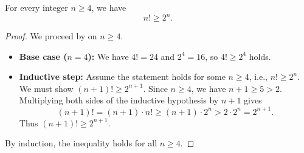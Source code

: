 \begin{lemma} \label{lemma:factorial_lower_bound_by_power_of_two_for_n_ge_4}
    For every integer $n \geq 4$, we have
    $$n! \geq 2^n.$$
\end{lemma}
\begin{proof}
    We proceed by  on $n \geq 4$.
    \begin{itemize}
        \item \textbf{Base case ($n = 4$):} We have $4! = 24$ and $2^4 = 16$, so $4! \geq 2^4$ holds.
        \item \textbf{Inductive step:} Assume the statement holds for some $n \geq 4$, i.e., $n! \geq 2^n$. We must show $(n+1)! \geq 2^{n+1}$.
        Since $n \geq 4$, we have $n+1 \geq 5 > 2$. Multiplying both sides of the inductive hypothesis by $n+1$ gives
        $$(n+1)! = (n+1) \cdot n! \geq (n+1) \cdot 2^n > 2 \cdot 2^n = 2^{n+1}.$$
        Thus $(n+1)! \geq 2^{n+1}$.
    \end{itemize}
    By induction, the inequality holds for all $n \geq 4$.
\end{proof}